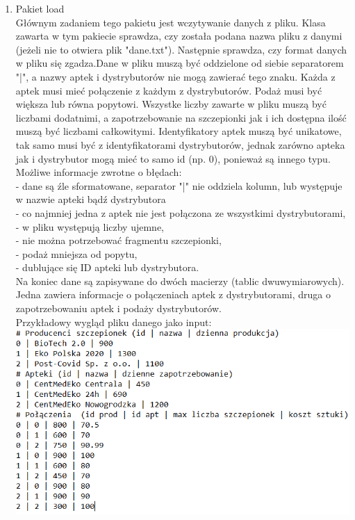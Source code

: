 \documentclass[11pt]{article}
\begin{document}
\begin{enumerate}
\begin{enumerate}[label=\arabic{enumi}.\arabic*.]
 \item  Pakiet load\\
Głównym zadaniem tego pakietu jest wczytywanie danych z pliku. Klasa zawarta w tym pakiecie sprawdza, czy została podana nazwa pliku z danymi (jeżeli nie to otwiera plik "dane.txt").  Następnie sprawdza, czy format danych w pliku się zgadza.Dane w pliku muszą być oddzielone od siebie separatorem "|", a nazwy aptek i dystrybutorów nie mogą zawierać tego znaku. Każda z aptek musi mieć połączenie z każdym z dystrybutorów. Podaż musi być większa lub równa popytowi. Wszystke liczby zawarte w pliku muszą być liczbami dodatnimi, a zapotrzebowanie na szczepionki jak i ich dostępna ilość muszą być liczbami całkowitymi. Identyfikatory aptek muszą być unikatowe, tak samo musi być z identyfikatorami dystrybutorów, jednak zarówno apteka jak i dystrybutor mogą mieć to samo id (np. 0), ponieważ są innego typu. Możliwe informacje zwrotne o błędach:\\
- dane są źle sformatowane, separator "|" nie oddziela kolumn, lub występuje w nazwie apteki bądź dystrybutora \\
- co najmniej jedna z aptek nie jest połączona ze wszystkimi dystrybutorami,\\
- w pliku występują liczby ujemne,\\
- nie można potrzebować fragmentu szczepionki,\\
- podaż mniejsza od popytu,\\
- dublujące się ID apteki lub dystrybutora.\\
Na koniec dane są zapisywane do dwóch macierzy (tablic dwuwymiarowych). Jedna zawiera informacje o połączeniach aptek z dystrybutorami, druga o zapotrzebowaniu aptek i podaży dystrybutorów. \\
Przykładowy wygląd pliku danego jako input:\\
\includegraphics {in.png}

\end{enumerate}
\end{enumerate}
\end{document}
